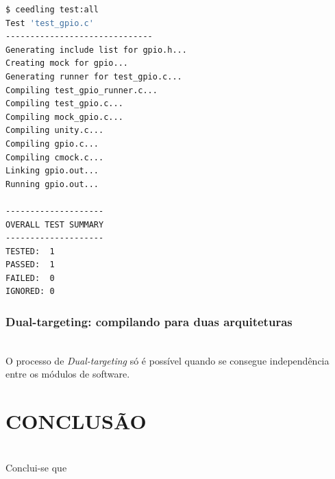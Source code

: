 \documentclass[times, twoside, watermark]{artigo}
\begin{document}
\begin{lstlisting}[language=bash, caption=Rodando o primeiro teste com \textit{Ceedling}]
$ ceedling test:all
Test 'test_gpio.c'
------------------------------
Generating include list for gpio.h...
Creating mock for gpio...
Generating runner for test_gpio.c...
Compiling test_gpio_runner.c...
Compiling test_gpio.c...
Compiling mock_gpio.c...
Compiling unity.c...
Compiling gpio.c...
Compiling cmock.c...
Linking gpio.out...
Running gpio.out...

--------------------
OVERALL TEST SUMMARY
--------------------
TESTED:  1
PASSED:  1
FAILED:  0
IGNORED: 0
\end{lstlisting}

\subsubsection{Dual-targeting: compilando para duas arquiteturas}\hfill\\

O processo de \textit{Dual-targeting} só é possível quando se consegue independência
entre os módulos de software.





\section{CONCLUSÃO}\hfill\\
Conclui-se que 



\end{document}
